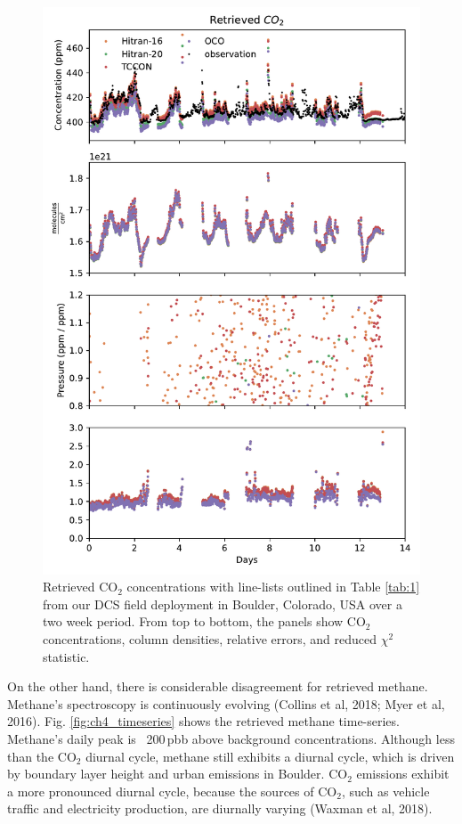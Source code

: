 \documentclass[amt, manuscript]{copernicus}
\begin{document}
\begin{figure}
  \centering
  \includegraphics{co2_timeseries.pdf}
  \caption{Retrieved CO$_2$ concentrations with line-lists outlined in Table \ref{tab:1} from our DCS field deployment in Boulder, Colorado, USA over a two week period. From top to bottom, the panels show CO$_2$ concentrations, column densities, relative errors, and reduced $\chi^2$ statistic. }
  \label{fig:co2_timeseries}
\end{figure}



On the other hand, there is considerable disagreement for retrieved methane. Methane’s spectroscopy is continuously evolving (Collins et al, 2018; Myer et al, 2016). Fig. \ref{fig:ch4_timeseries} shows the retrieved methane time-series. Methane’s daily peak is ~200\,pbb above background concentrations. Although less than the CO$_2$ diurnal cycle, methane still exhibits a diurnal cycle, which is driven by boundary layer height and urban emissions in Boulder. CO$_2$ emissions exhibit a more pronounced diurnal cycle, because the sources of CO$_2$, such as vehicle traffic and electricity production, are diurnally varying (Waxman et al, 2018).
\end{document}
